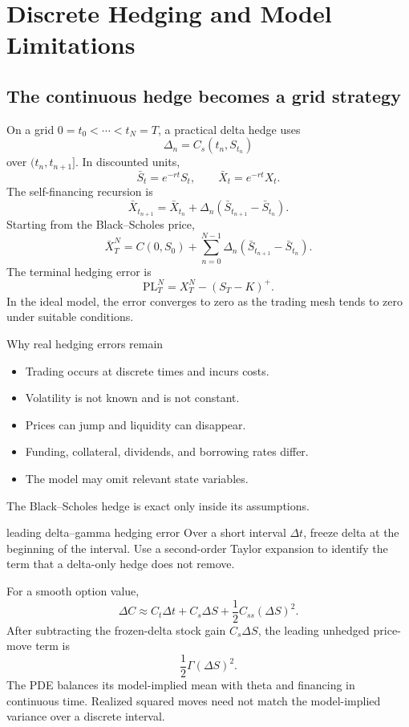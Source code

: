 \documentclass[10pt]{article}
\newcommand{\1}{\mathbf 1}
\theoremstyle{definition}
\begin{document}
\section{Discrete Hedging and Model Limitations}

\subsection{The continuous hedge becomes a grid strategy}

On a grid \(0=t_0<\cdots<t_N=T\), a practical delta hedge uses
\[
\Delta_n=C_s(t_n,S_{t_n})
\]
over \((t_n,t_{n+1}]\). In discounted units,
\[
\bar S_t=e^{-rt}S_t,\qquad
\bar X_t=e^{-rt}X_t.
\]
The self-financing recursion is
\[
\boxed{
\bar X_{t_{n+1}}
=\bar X_{t_n}
+\Delta_n(\bar S_{t_{n+1}}-\bar S_{t_n}).}
\]
Starting from the Black--Scholes price,
\[
\boxed{
\bar X_T^N
=C(0,S_0)
+\sum_{n=0}^{N-1}
\Delta_n(\bar S_{t_{n+1}}-\bar S_{t_n}).}
\]
The terminal hedging error is
\[
\mathrm{PL}_T^N
=X_T^N-(S_T-K)^+.
\]
In the ideal model, the error converges to zero as the trading mesh tends to
zero under suitable conditions.

\begin{warningbox}{Why real hedging errors remain}
\begin{itemize}
  \item Trading occurs at discrete times and incurs costs.
  \item Volatility is not known and is not constant.
  \item Prices can jump and liquidity can disappear.
  \item Funding, collateral, dividends, and borrowing rates differ.
  \item The model may omit relevant state variables.
\end{itemize}
The Black--Scholes hedge is exact only inside its assumptions.
\end{warningbox}

\begin{studentexercise}{leading delta--gamma hedging error}
Over a short interval \(\Delta t\), freeze delta at the beginning of the
interval. Use a second-order Taylor expansion to identify the term that a
delta-only hedge does not remove.
\end{studentexercise}
\begin{shortsolution}
For a smooth option value,
\[
\Delta C
\approx C_t\Delta t+C_s\Delta S+\frac12C_{ss}(\Delta S)^2.
\]
After subtracting the frozen-delta stock gain \(C_s\Delta S\), the leading
unhedged price-move term is
\[
\boxed{\frac12\Gamma(\Delta S)^2.}
\]
The PDE balances its model-implied mean with theta and financing in
continuous time. Realized squared moves need not match the model-implied
variance over a discrete interval.
\end{shortsolution}
\end{document}
